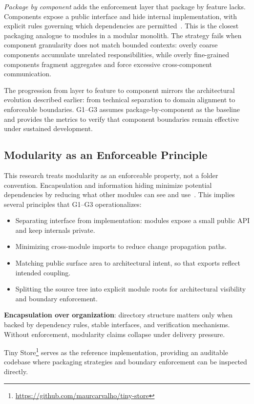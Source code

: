 \emph{Package by component} adds the enforcement layer that package by feature lacks. Components expose a public interface and hide internal implementation, with explicit rules governing which dependencies are permitted~\cite{evans2003ddd}. This is the closest packaging analogue to modules in a modular monolith. The strategy fails when component granularity does not match bounded contexts: overly coarse components accumulate unrelated responsibilities, while overly fine-grained components fragment aggregates and force excessive cross-component communication.

The progression from layer to feature to component mirrors the architectural evolution described earlier: from technical separation to domain alignment to enforceable boundaries. G1--G3 assumes package-by-component as the baseline and provides the metrics to verify that component boundaries remain effective under sustained development.

\subsection*{Modularity as an Enforceable Principle}

This research treats modularity as an enforceable property, not a folder convention. Encapsulation and information hiding minimize potential dependencies by reducing what other modules can see and use~\cite{parnas1972informationhiding}. This implies several principles that G1--G3 operationalizes:

\begin{itemize}
    \item Separating interface from implementation: modules expose a small public API and keep internals private.
    \item Minimizing cross-module imports to reduce change propagation paths.
    \item Matching public surface area to architectural intent, so that exports reflect intended coupling.
    \item Splitting the source tree into explicit module roots for architectural visibility and boundary enforcement.
\end{itemize}

\textbf{Encapsulation over organization}: directory structure matters only when backed by dependency rules, stable interfaces, and verification mechanisms. Without enforcement, modularity claims collapse under delivery pressure.

Tiny Store\footnote{\url{https://github.com/maurcarvalho/tiny-store}} serves as the reference implementation, providing an auditable codebase where packaging strategies and boundary enforcement can be inspected directly.

